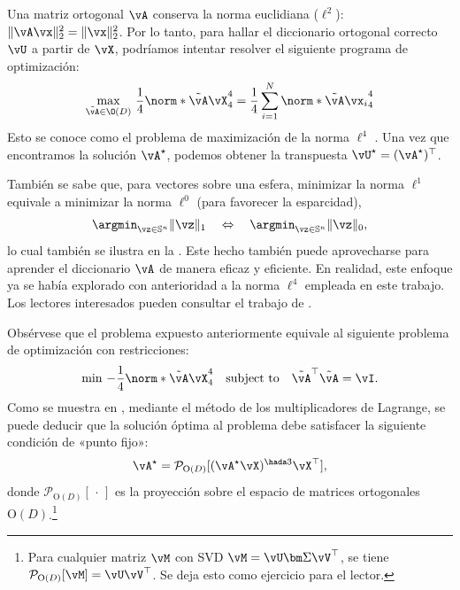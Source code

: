 \documentclass[../../book-main.tex]{subfiles}
\begin{document}
Una matriz ortogonal $\vA$ conserva la norma euclidiana (\(\ell^{2}\)):
$\|\vA \vx\|_2^2 = \|\vx\|_2^2$. Por lo tanto, para hallar el
diccionario ortogonal correcto $\vU$ a partir de $\vX$, podríamos intentar resolver el
siguiente programa de optimización:
\begin{equation}\label{eq0:orthogonal-dictionary-learning-l4}
    \max_{\tilde{\vA} \in \O(D)}\,
    \frac{1}{4} \norm*{
        \tilde{\vA} \vX
    }_4^4 =  \frac{1}{4} \sum_{i=1}^N \norm*{
        \tilde{\vA} \vx_i
    }_4^4
\end{equation}
Esto se conoce como el problema de maximización de la norma $\ell^4$ \cite{Zhai-2020}. Una vez que
encontramos la solución \(\vA^{\star}\), podemos obtener la transpuesta \(\vU^{\star}
= (\vA^{\star})^{\top}\).
\begin{remark}
    También se sabe que, para vectores sobre una esfera, minimizar la
    norma $\ell^1$ equivale a minimizar la norma $\ell^0$ (para
    favorecer la esparcidad),
    \begin{equation*}
        \argmin_{\vz \in
        \mathbb{S}^n}\|\vz\|_{1}\quad\Leftrightarrow\quad
        \argmin_{\vz \in \mathbb{S}^n}\|\vz\|_{0},
    \end{equation*}
    lo cual también se ilustra en la . Este hecho también puede
    aprovecharse para aprender el diccionario $\vA$ de manera eficaz y
    eficiente. En realidad, este enfoque ya se había explorado con anterioridad a la norma $\ell^4$
    empleada en este trabajo. Los lectores interesados pueden consultar el trabajo de
    \cite{qu2020findingsparsestvectorssubspace}.
\end{remark}

Obsérvese que el problema expuesto anteriormente equivale al siguiente
problema de optimización con restricciones:
\begin{equation}\label{eq:orthogonal-dictionary-learning-l4}
    \min\,
    -   \frac{1}{4} \norm*{
        \tilde{\vA} \vX
    }_4^4 \quad \mbox{subject to} \quad  \tilde{\vA}^\top\tilde{\vA} = \vI.
\end{equation}
Como se muestra en \cite{Wright-Ma-2022}, mediante el método de los multiplicadores de Lagrange,
se puede deducir que la solución óptima al problema
debe satisfacer la siguiente condición de «punto fijo»:
\begin{equation}
    \vA^{\star} = \mathcal{P}_{\mathrm O(D)}[( {\vA^{\star}
    \vX})^{\hada 3}\vX^\top],
\end{equation}
donde $\mathcal{P}_{\mathrm O(D)}[\,\cdot\,]$ es la proyección sobre el espacio de
matrices ortogonales $\mathrm O(D)$.\footnote{Para cualquier matriz $\vM$
    con SVD $\vM = \vU\bm \Sigma \vV^\top$, se tiene $\mathcal{P}_{\mathrm
O(D)}[\vM] = \vU \vV^\top$. Se deja esto como ejercicio para el lector.}
\end{document}
